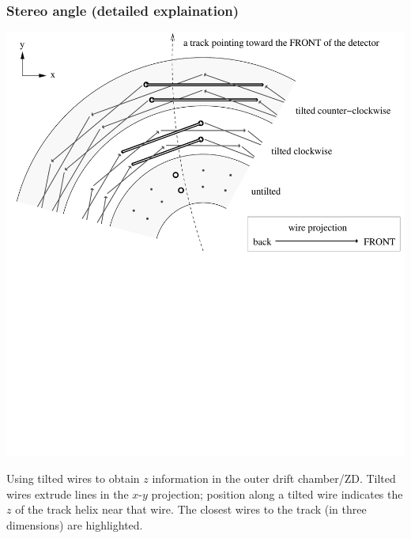 \documentclass[12pt,compress]{beamer}
\begin{document}
\begin{frame}
\frametitle{Stereo angle (detailed explaination)}
\begin{center}
\includegraphics[width=0.9\linewidth, viewport=0 480 892 947]{stereotwist}
\end{center}

\vfill
\begin{minipage}{\linewidth}
\scriptsize Using tilted wires to obtain $z$ information in the outer
drift chamber/ZD.  Tilted wires extrude lines in the $x$-$y$
projection; position along a tilted wire indicates the $z$ of the
track helix near that wire.  The closest wires to the track (in three
dimensions) are highlighted.
\end{minipage}
\end{frame}
\end{document}

